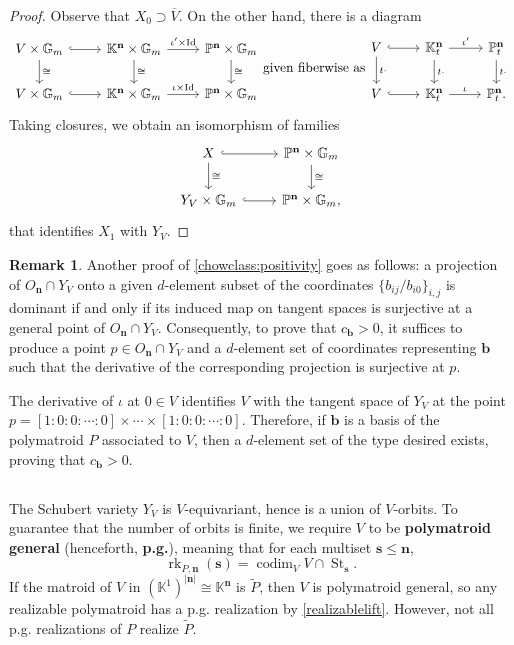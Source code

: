 \documentclass[11pt]{article}
\theoremstyle{definition}
\newtheorem{rema}[theo]{Remark}
\numberwithin{equation}{section}
\renewcommand{\P}{\mathbb{P}}
\newcommand{\Gm}{\mathbb{G}_m}
\DeclareMathOperator{\St}{St}
\newcommand{\K}{\mathbb{K}}
\DeclareMathOperator{\rk}{rk}
\DeclareMathOperator{\codim}{codim}
\DeclareMathOperator{\Id}{Id}
\newcommand{\word}[1]{\textbf{#1}}
\newcommand{\revision}[1]{{#1}}
\begin{document}
\begin{proof}
  Observe that $X_0 \supset \overline V$.
  On the other hand, there is a diagram
  {\small \[\begin{tikzcd}
      V \times \Gm \ar[r,hook] \ar[d,"\cong"] & \K^{\mathbf n} \times \Gm \ar[r, "\iota' \times \Id"]\ar[d,"\cong"] & \P^{\mathbf n} \times \Gm \ar[d, "\cong"] \\
      V \times \Gm \ar[r,hook] & \K^{\mathbf n} \times \Gm \ar[r, "\iota \times \Id"] & \P^{\mathbf n} \times \Gm 
    \end{tikzcd} \text{given fiberwise as} 
  \begin{tikzcd}
    V \ar[r, hook]\ar[d, "t \cdot"] & \K^{\mathbf n}_t \ar[r, "\iota'"] \ar[d,"t\cdot"] & \P^{\mathbf n}_t \ar[d, "t\cdot"]\\
    V \ar[r, hook] & \K^{\mathbf n}_t \ar[r, "\iota"] & \P^{\mathbf n}_t.
  \end{tikzcd}
  \]}
Taking closures, we obtain an isomorphism of families
\[\begin{tikzcd}
    X \ar[r,hook] \ar[d,"\cong"] & \P^{\mathbf n} \times \Gm \ar[d,"\cong"] \\
    Y_V \times \Gm \ar[r,hook] & \P^{\mathbf n} \times \Gm,
    \end{tikzcd}
  \]
  that identifies $X_1$ with $Y_V$.
\end{proof}
\revision{
\begin{rema}
  Another proof of \cref{chowclass:positivity} goes as follows: a projection of $O_{\mathbf n} \cap Y_V$ onto a given $d$-element subset of the coordinates $\{b_{ij} / b_{i0}\}_{i,j}$ is dominant if and only if its induced map on tangent spaces is surjective at a general point of $O_{\mathbf n} \cap Y_V$. Consequently, to prove that $c_{\mathbf b} > 0$, it suffices to produce a point $p \in O_{\mathbf n} \cap Y_V$ and a $d$-element set of coordinates representing $\mathbf b$ such that the derivative of the corresponding projection is surjective at $p$.


  The derivative of $\iota$ at $0 \in V$ identifies $V$ with the tangent space of $Y_V$ at the point $p = [1:0:0:\cdots:0] \times \cdots \times [1:0:0:\cdots:0]$.
  Therefore, if $\mathbf b$ is a basis of the polymatroid $P$ associated to $V$, then a $d$-element set of the type desired exists, proving that $c_{\mathbf b} > 0$.
\end{rema}}

\subsection{}\label{pgprops}
The Schubert variety $Y_V$ is $V$-equivariant, hence is a union of $V$-orbits.
To guarantee that the number of orbits is finite, we require
$V$ to be \word{polymatroid general} (henceforth, \word{p.g.}), meaning that for each multiset $\mathbf s \leq \mathbf n$,
\[
  \rk_{P, \mathbf n}(\mathbf s) = \codim_V V \cap \St_{\mathbf s}.
\]
If the matroid of $V$ in $(\K^1)^{|\mathbf n|} \cong \K^{\mathbf n}$ is $\widetilde P$, then $V$ is polymatroid general, so any realizable polymatroid has a p.g. realization by \cref{realizablelift}.
However, not all p.g. realizations of $P$ realize $\widetilde P$.
\end{document}
